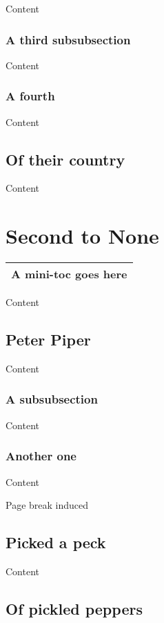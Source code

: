 \documentclass{article}
\newcommand{\insMinitoctab}[2][]{%
    \begin{center}#2
    \begin{tabular}{c}\toprule
    \begin{minipage}[c]{0.8\linewidth}
    \ifMiniTocListings
      \insertminitoc[#1]\else
      \centering\textbf{A mini-toc goes here}\fi
    \end{minipage}\\ \bottomrule
    \end{tabular}
    \end{center}
}
\begin{document}
Content

\subsubsection{A third subsubsection}

Content

\subsubsection{A fourth}

Content

\subsection{Of their country}

Content


\newpage

\section{Second to None}

\insMinitoctab{\minitocFmt}


Content

\subsection{Peter Piper}

Content

\subsubsection{A subsubsection}

Content

\subsubsection{Another one}

Content

\vfill Page break induced
\newpage


\subsection{Picked a peck}

Content

\subsection{Of pickled peppers}
\end{document}
